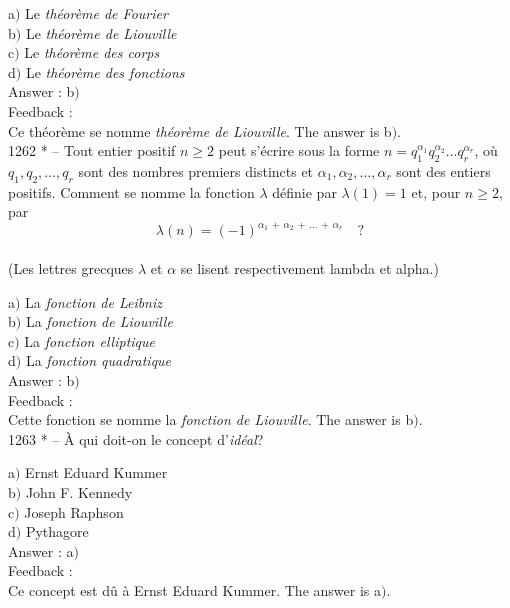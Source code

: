 ﻿\documentclass[letterpaper, 12pt]{article}
\begin{document}
a$)$ Le {\sl th\'eor\`eme de Fourier} \\
b$)$ Le {\sl th\'eor\`eme de Liouville} \\
c$)$ Le {\sl th\'eor\`eme des corps} \\
d$)$ Le {\sl th\'eor\`eme des fonctions}\\

Answer : b$)$\\

Feedback : \\
Ce th\'eor\`eme se nomme {\sl th\'eor\`eme de Liouville}.
The answer is b$)$.\\

1262 * -- Tout entier positif $n\ge2$ peut s'\'ecrire sous la forme
$n=q_1^{\alpha_1}q_2^{\alpha_2}\ldots q_r^{\alpha_r}$, o\`u
$q_1,q_2,\ldots,q_r$ sont des nombres premiers distincts et
$\alpha_1,\alpha_2,\ldots,\alpha_r$ sont des entiers positifs.
Comment se nomme la fonction $\lambda$ d\'efinie par $\lambda(1)=1$
et, pour $n\ge2$, par
$$\lambda(n)=(-1)^{\alpha_1\,+\,\alpha_2\,+\,\ldots\,+\,\alpha_r}\quad?$$\\
(Les lettres grecques $\lambda$ et $\alpha$ se lisent respectivement
lambda et alpha.)

a$)$ La {\sl fonction de Leibniz} \\
b$)$ La {\sl fonction de Liouville} \\
c$)$ La {\sl fonction elliptique} \\
d$)$ La {\sl fonction quadratique}\\

Answer : b$)$\\

Feedback : \\
Cette fonction se nomme la {\sl fonction de Liouville}.
The answer is b$)$.\\

1263 * -- \`A qui doit-on le concept d'{\sl id\'eal}?

a$)$ Ernst Eduard Kummer \\
b$)$ John F. Kennedy \\
c$)$ Joseph Raphson \\
d$)$ Pythagore\\

Answer : a$)$\\

Feedback : \\
Ce concept est d\^u \`a Ernst Eduard Kummer.
The answer is a$)$.\\
\end{document}
